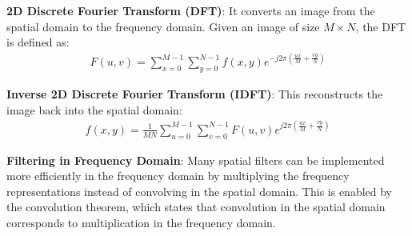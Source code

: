 \textbf{2D Discrete Fourier Transform (DFT)}: It converts an image from the spatial domain to the frequency domain. Given an image of size $M \times N$, the DFT is defined as:
\begin{align}
    F(u,v) = \sum_{x=0}^{M-1} \sum_{y=0}^{N-1} f(x,y) e^{-j 2\pi \left(\frac{ux}{M} + \frac{vy}{N}\right)}
\end{align}

\textbf{Inverse 2D Discrete Fourier Transform (IDFT)}: This reconstructs the image back into the spatial domain:
\begin{align}
    f(x,y) = \frac{1}{MN} \sum_{u=0}^{M-1} \sum_{v=0}^{N-1} F(u,v) e^{j 2\pi \left(\frac{ux}{M} + \frac{vy}{N}\right)}
\end{align}

\textbf{Filtering in Frequency Domain}: Many spatial filters can be implemented more efficiently in the frequency domain by multiplying the frequency representations instead of convolving in the spatial domain. This is enabled by the convolution theorem, which states that convolution in the spatial domain corresponds to multiplication in the frequency domain.




